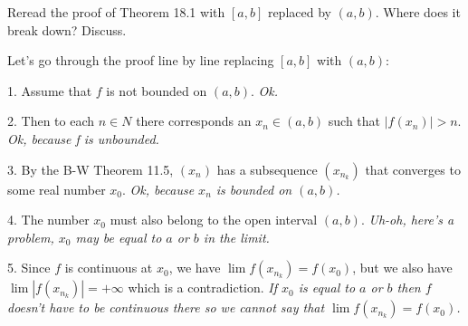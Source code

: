 
Reread the proof of Theorem 18.1 with $[a,b]$ replaced by $(a,b)$.
Where does it break down? Discuss.

\medskip

Let's go through the proof line by line replacing $[a,b]$ with $(a,b)$:

\item{1.}
Assume that $f$ is not bounded on $(a,b)$. {\it Ok.}

\item{2.}
Then to each $n\in N$ there corresponds an $x_n\in (a,b)$ such that
$|f(x_n)|>n$. {\it Ok, because f is unbounded.}

\item{3.}
By the B-W Theorem 11.5, $(x_n)$ has a subsequence $(x_{n_k})$ that converges
to some real number $x_0$.
{\it Ok, because $x_n$ is bounded on $(a,b)$.}

\item{4.}
The number $x_0$ must also belong to the open interval $(a,b)$.
{\it Uh-oh, here's a problem, $x_0$ may be equal to $a$ or $b$ in the limit.}

\item{5.}
Since $f$ is continuous at $x_0$, we have $\lim f(x_{n_k})=f(x_0)$,
but we also have $\lim|f(x_{n_k})|=+\infty$ which is a contradiction.
{\it If $x_0$ is equal to $a$ or $b$ then $f$ doesn't have to be continuous
there so we cannot say that $\lim f(x_{n_k})=f(x_0)$.}


